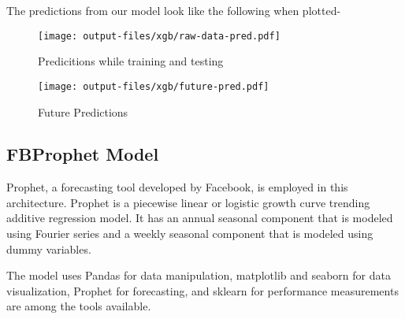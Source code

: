 \documentclass[12pt]{article}
\begin{document}


\pagebreak

The predictions from our model look like the following when plotted-
\begin{figure}[H]
    \centering
    \texttt{[image: output-files/xgb/raw-data-pred.pdf]}
    \caption{Predicitions while training and testing}
    \label{fig:enter-label}
\end{figure}
\begin{figure}[H]
    \centering
    \texttt{[image: output-files/xgb/future-pred.pdf]}
    \caption{Future Predictions}
    \label{fig:enter-label}
\end{figure}
\subsection{FBProphet Model}
Prophet, a forecasting tool developed by Facebook, is employed in this architecture. Prophet is a piecewise linear or logistic growth curve trending additive regression model. \cite{fbprophet} It has an annual seasonal component that is modeled using Fourier series and a weekly seasonal component that is modeled using dummy variables. \cite{fbprophetpaper}

The model uses Pandas for data manipulation, matplotlib and seaborn for data visualization, Prophet for forecasting, and sklearn for performance measurements are among the tools available. 
\end{document}
